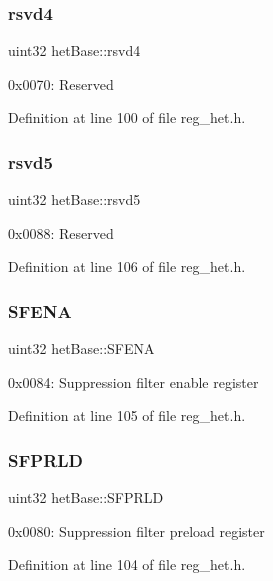 \subsubsection{\texorpdfstring{rsvd4}{rsvd4}}
{\footnotesize\ttfamily uint32 het\+Base\+::rsvd4}

0x0070\+: Reserved 

Definition at line 100 of file reg\+\_\+het.\+h.

\mbox{\label{structhetBase_a9a002e73890423826a75542b4f97e607}} 
\subsubsection{\texorpdfstring{rsvd5}{rsvd5}}
{\footnotesize\ttfamily uint32 het\+Base\+::rsvd5}

0x0088\+: Reserved 

Definition at line 106 of file reg\+\_\+het.\+h.

\mbox{\label{structhetBase_a212dad3d077e298126bff622c0865071}} 
\subsubsection{\texorpdfstring{S\+F\+E\+NA}{SFENA}}
{\footnotesize\ttfamily uint32 het\+Base\+::\+S\+F\+E\+NA}

0x0084\+: Suppression filter enable register 

Definition at line 105 of file reg\+\_\+het.\+h.

\mbox{\label{structhetBase_a7a3d05f3e184d880425318e097dcb792}} 
\subsubsection{\texorpdfstring{S\+F\+P\+R\+LD}{SFPRLD}}
{\footnotesize\ttfamily uint32 het\+Base\+::\+S\+F\+P\+R\+LD}

0x0080\+: Suppression filter preload register 

Definition at line 104 of file reg\+\_\+het.\+h.

\mbox{\label{structhetBase_a8dd2df1fecb8befed572409c132961b4}} 
